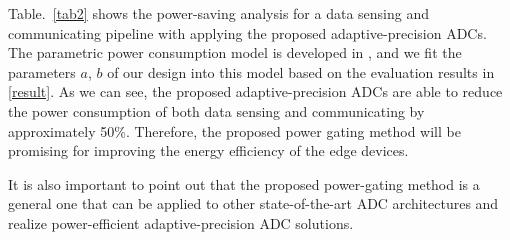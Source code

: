 Table.~\ref{tab2} shows the power-saving analysis for a data sensing and communicating pipeline with applying the proposed adaptive-precision ADCs. The parametric power consumption model is developed in \cite{lubana_digital_2018}, and we fit the parameters $a$, $b$ of our design into this model based on the evaluation results in \ref{result}. As we can see, the proposed adaptive-precision ADCs are able to reduce the power consumption of both data sensing and communicating by approximately 50\%. Therefore, the proposed power gating method will be promising for improving the energy efficiency of the edge devices.  

It is also important to point out that the proposed power-gating method is a general one 
that can be applied to other state-of-the-art ADC architectures and realize power-efficient 
adaptive-precision ADC solutions. 



